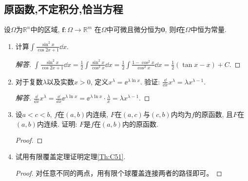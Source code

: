 \subsection{原函数,不定积分,恰当方程}
\begin{theorem}\label{Th:C51}
设\(\varOmega\)为\(\mathbb{R}^n\)中的区域, 
\(\boldsymbol{f}:\varOmega\rightarrow\mathbb{R}^m\)
在\(\varOmega\)中可微且微分恒为\(\boldsymbol{0}\), 
则\(\boldsymbol{f}\)在\(\varOmega\)中恒为常量.
\end{theorem}
\begin{1a}
\begin{enumerate}
\item 计算\(\int \frac{\sin^2 x}{\cos 2x+1}\dd x\).
\begin{proof}[解答]
\(\int \frac{\sin^2 x}{\cos 2x+1}\dd x=\frac{1}{2}\int\frac{\sin^2x}{\cos^2x}\dd x
=\frac{1}{2}\int\frac{1-\cos^2x}{\cos^2x}\dd x=\frac{1}{2}\left(\tan x-x\right)+C.\)
\end{proof}
\item 对于复数\(\lambda\)以及实数\(x>0\), 定义\(x^\lambda=\ee^{\lambda\ln x}\). 
验证: \(\frac{\dd}{\dd x}x^{\lambda}=\lambda x^{\lambda-1}\).
\begin{proof}[解答]
\(\frac{\dd}{\dd x}x^\lambda=\frac{\dd}{\dd x}\ee^{\lambda\ln x}
=\ee^{\lambda\ln x}\cdot\frac{\lambda}{x}=\lambda x^{\lambda-1}.\)
\end{proof}
\item 设\(a<c<b\), \(f\)在\((a,b)\)内连续, \(F\)在\((a,c)\)与\((c,b)\)内均为\(f\)的原函数, 且\(F\)在\((a,b)\)内连续. 证明: \(F\)是\(f\)在\((a,b)\)内的原函数.
\begin{proof}

\end{proof}
\item 试用有限覆盖定理证明定理\ref{Th:C51}.
\begin{proof}
对任意不同的两点，用有限个球覆盖连接两者的路径即可。
\end{proof}
\end{enumerate}
\end{1a}
